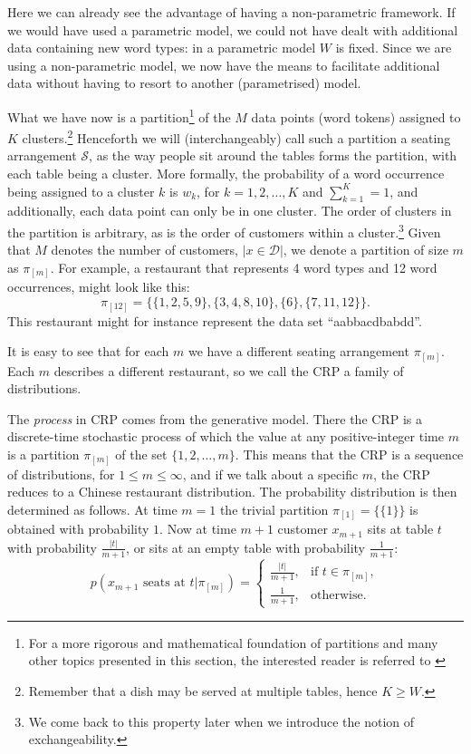 Here we can already see the advantage of having a non-parametric framework. If we would have used a parametric model, we could not have dealt with additional data containing new word types: in a parametric model $W$ is fixed. Since we are using a non-parametric model, we now have the means to facilitate additional data without having to resort to another (parametrised) model.

What we have now is a partition\footnote{For a more rigorous and mathematical foundation of partitions and many other topics presented in this section, the interested reader is referred to \cite{Pitman2006Combinatorial}} of the $M$ data points (word tokens) assigned to $K$ clusters.\footnote{Remember that a dish may be served at multiple tables, hence $K\geq W$.} Henceforth we will (interchangeably) call such a partition a seating arrangement $\mathcal{S}$, as the way people sit around the tables forms the partition, with each table being a cluster. More formally, the probability of a word occurrence being assigned to a cluster $k$ is $w_k$, for $k = 1, 2, \ldots, K$ and $\sum_{k=1}^K = 1$, and additionally, each data point can only be in one cluster. The order of clusters in the partition is arbitrary, as is the order of customers within a cluster.\footnote{We come back to this property later when we introduce the notion of exchangeability.} Given that $M$ denotes the number of customers, $|x\in\mathcal{D}|$, we denote a partition of size $m$ as $\pi_{[m]}$. %
%
%
For example, a restaurant that represents 4 word types and 12 word occurrences, might look like this: 
\begin{equation}\label{eq:partitionexample}
	\pi_{[12]} = \{\{1,2,5,9\},\{3,4,8,10\},\{6\},\{7,11,12\}\}.
\end{equation}
This restaurant might for instance represent the data set ``aabbacdbabdd''. 

It is easy to see that for each $m$ we have a different seating arrangement $\pi_{[m]}$. Each $m$ describes a different restaurant, so we call the CRP a family of distributions.

The \emph{process}\/ in CRP comes from the generative model. There the CRP is a discrete-time stochastic process of which the value at any positive-integer time $m$ is a partition $\pi_{[m]}$ of the set $\{1,2,\ldots,m\}$. This means that the CRP is a sequence of distributions, for $1\leq m \leq\infty$, and if we talk about a specific $m$, the CRP reduces to a Chinese restaurant distribution. The probability distribution is then determined as follows. At time $m=1$ the trivial partition $\pi_{[1]}=\{\{1\}\}$ is obtained with probability $1$. 
Now at time $m+1$ customer $x_{m+1}$ sits at table $t$ with probability $\frac{|t|}{m+1}$, or sits at an empty table with probability $\frac{1}{m+1}$: 
\begin{equation}\label{eq:crp-table}
	p(x_{m+1}\text{ seats at }t|\pi_{[m]}) = 
    \begin{cases}
    	\frac{|t|}{m+1}, & \text{if }t\in\pi_{[m]},\\
    	\frac{1}{m+1}, & \text{otherwise}.
  	\end{cases}
\end{equation}

